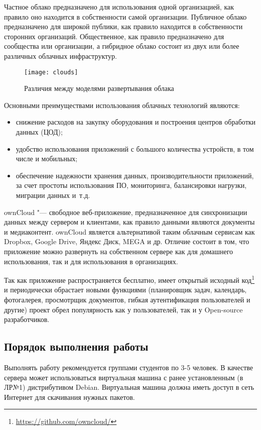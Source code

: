Частное облако предназначено для использования одной организацией, как правило оно находится в собственности самой организации.
Публичное облако предназначено для широкой публики, как правило находится в собственности сторонних организаций.
Общественное, как правило предназначено для сообщества или организации, а гибридное облако состоит из двух или более различных облачных инфраструктур.

\begin{figure}[ht]
    \centering
	\texttt{[image: clouds]}
	\caption{Различия между моделями развертывания облака}\label{pic:clouds}
\end{figure}

Основными преимуществами использования облачных технологий являются:
\begin{itemize}
    \item снижение расходов на закупку оборудования и построения центров обработки данных (ЦОД);
    \item удобство использования приложений с большого количества устройств, в том числе и мобильных;
    \item обеспечение надежности хранения данных, производительности приложений, за счет простоты использования ПО, мониторинга, балансировки нагрузки, миграции данных и~т.д.
\end{itemize}

ownCloud "--- свободное веб-приложение, предназначенное для синхронизации данных между сервером и клиентами, как правило данными являются документы и медиаконтент.
ownCloud является альтернативой таким облачным сервисам как Dropbox, Google Drive, Яндекс Диск, MEGA и др.
Отличие состоит в том, что приложение можно развернуть на собственном сервере как для домашнего использования, так и для использования в организациях.

Так как приложение распространяется бесплатно, имеет открытый исходный код\footnote{\url{https://github.com/owncloud/}} и периодически обрастает новыми функциями (планировщик задач, календарь, фотогалерея, просмотрщик документов, гибкая аутентификация пользователей и другие) проект обрел популярность как у пользователей, так и у Open-source разработчиков.

\subsection{Порядок выполнения работы}

Выполнять работу рекомендуется группами студентов по 3-5 человек.
В качестве сервера может использоваться виртуальная машина с ранее установленным (в ЛР№1) дистрибутивом Debian.
Виртуальная машина должна иметь доступ в сеть Интернет для скачивания нужных пакетов.

